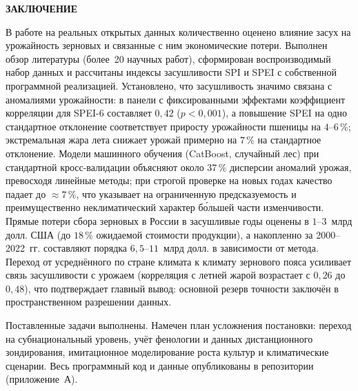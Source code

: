 \documentclass[14pt,a4paper]{extarticle}
\newcommand{\structhead}[1]{%
  \clearpage\phantomsection\addcontentsline{toc}{section}{#1}%
  \begin{center}\bfseries\large\MakeUppercase{#1}\end{center}\par\nopagebreak\medskip}
\begin{document}
\structhead{Заключение}

В работе на реальных открытых данных количественно оценено влияние засух на урожайность зерновых и связанные с ним экономические потери. Выполнен обзор литературы (более~20 научных работ), сформирован воспроизводимый набор данных и рассчитаны индексы засушливости SPI и SPEI с собственной программной реализацией. Установлено, что засушливость значимо связана с аномалиями урожайности: в панели с фиксированными эффектами коэффициент корреляции для SPEI-6 составляет $0{,}42$ ($p<0{,}001$), а повышение SPEI на одно стандартное отклонение соответствует приросту урожайности пшеницы на $4$--$6\,\%$; экстремальная жара лета снижает урожай примерно на $7\,\%$ на стандартное отклонение. Модели машинного обучения (CatBoost, случайный лес) при стандартной кросс-валидации объясняют около $37\,\%$ дисперсии аномалий урожая, превосходя линейные методы; при строгой проверке на новых годах качество падает до $\approx7\,\%$, что указывает на ограниченную предсказуемость и преимущественно неклиматический характер бо́льшей части изменчивости. Прямые потери сбора зерновых в России в засушливые годы оценены в $1$--$3$~млрд долл. США (до $18\,\%$ ожидаемой стоимости продукции), а накопленно за 2000--2022~гг. составляют порядка $6{,}5$--$11$~млрд долл. в зависимости от метода. Переход от усреднённого по стране климата к климату зернового пояса усиливает связь засушливости с урожаем (корреляция с летней жарой возрастает с $0{,}26$ до $0{,}48$), что подтверждает главный вывод: основной резерв точности заключён в пространственном разрешении данных.

Поставленные задачи выполнены. Намечен план усложнения постановки: переход на субнациональный уровень, учёт фенологии и данных дистанционного зондирования, имитационное моделирование роста культур и климатические сценарии. Весь программный код и данные опубликованы в репозитории (приложение~А).

\clearpage
\printbibliography[heading=bibintoc,title={Список использованных источников}]

\appendix
\end{document}
